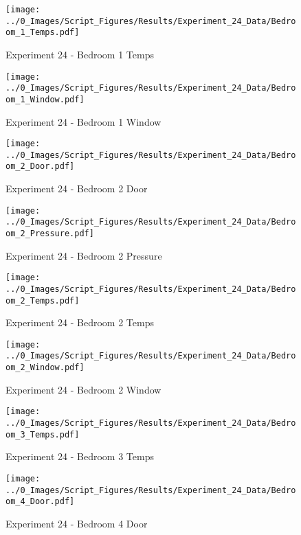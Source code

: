 	\begin{figure}[H]
		\centering
		\texttt{[image: ../0\_Images/Script\_Figures/Results/Experiment\_24\_Data/Bedroom\_1\_Temps.pdf]}
		\caption[]{Experiment 24 - Bedroom 1 Temps}
	\end{figure}
 
	\clearpage

	\begin{figure}[H]
		\centering
		\texttt{[image: ../0\_Images/Script\_Figures/Results/Experiment\_24\_Data/Bedroom\_1\_Window.pdf]}
		\caption[]{Experiment 24 - Bedroom 1 Window}
	\end{figure}
 

	\begin{figure}[H]
		\centering
		\texttt{[image: ../0\_Images/Script\_Figures/Results/Experiment\_24\_Data/Bedroom\_2\_Door.pdf]}
		\caption[]{Experiment 24 - Bedroom 2 Door}
	\end{figure}
 
	\clearpage

	\begin{figure}[H]
		\centering
		\texttt{[image: ../0\_Images/Script\_Figures/Results/Experiment\_24\_Data/Bedroom\_2\_Pressure.pdf]}
		\caption[]{Experiment 24 - Bedroom 2 Pressure}
	\end{figure}
 

	\begin{figure}[H]
		\centering
		\texttt{[image: ../0\_Images/Script\_Figures/Results/Experiment\_24\_Data/Bedroom\_2\_Temps.pdf]}
		\caption[]{Experiment 24 - Bedroom 2 Temps}
	\end{figure}
 
	\clearpage

	\begin{figure}[H]
		\centering
		\texttt{[image: ../0\_Images/Script\_Figures/Results/Experiment\_24\_Data/Bedroom\_2\_Window.pdf]}
		\caption[]{Experiment 24 - Bedroom 2 Window}
	\end{figure}
 

	\begin{figure}[H]
		\centering
		\texttt{[image: ../0\_Images/Script\_Figures/Results/Experiment\_24\_Data/Bedroom\_3\_Temps.pdf]}
		\caption[]{Experiment 24 - Bedroom 3 Temps}
	\end{figure}
 
	\clearpage

	\begin{figure}[H]
		\centering
		\texttt{[image: ../0\_Images/Script\_Figures/Results/Experiment\_24\_Data/Bedroom\_4\_Door.pdf]}
		\caption[]{Experiment 24 - Bedroom 4 Door}
	\end{figure}
 

